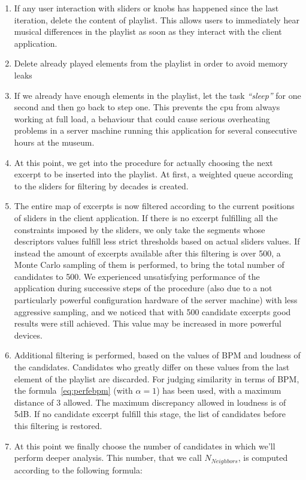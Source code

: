 \begin{enumerate}
\item If any user interaction with sliders or knobs has happened since the last iteration, delete the content of playlist. This allows users to immediately hear musical differences in the playlist as soon as they interact with the client application. 
\item Delete already played elements from the playlist in order to avoid memory leaks
\item If we already have enough elements in the playlist, let the task \textit{``sleep''} for one second and then go back to step one. This prevents the cpu from always working at full load, a behaviour that could cause serious overheating problems in a server machine running this application for several consecutive hours at the museum.
\item At this point, we get into the procedure for actually choosing the next excerpt to be inserted into the playlist. At first, a weighted queue according to the sliders for filtering by decades is created.
\item The entire map of excerpts is now filtered according to the current positions of sliders in the client application. If there is no excerpt fulfilling all the constraints imposed by the sliders, we only take the segments whose descriptors values fulfill less strict thresholds based on actual sliders values. If instead the amount of excerpts available after this filtering is over 500, a Monte Carlo sampling of them is performed, to bring the total number of candidates to 500. We experienced unsatisfying performance of the application during successive steps of the procedure (also due to a not particularly powerful configuration hardware of the server machine) with less aggressive sampling, and we noticed that with 500 candidate excerpts good results were still achieved. This value may be increased in more powerful devices. \
\item Additional filtering is performed, based on the values of BPM and loudness of the candidates. Candidates who greatly differ on these values from the last element of the playlist are discarded. For judging similarity in terms of BPM, the formula~\ref{eq:perfebpm} (with $\alpha = 1$) has been used, with a maximum distance of 3 allowed. The maximum discrepancy allowed in loudness is of 5dB. If no candidate excerpt fulfill this stage, the list of candidates before this filtering is restored. 
\item At this point we finally choose the number of candidates in which we'll perform deeper analysis. This number, that we call $N_{Neighbors}$, is computed according to the following formula:

\end{enumerate}
